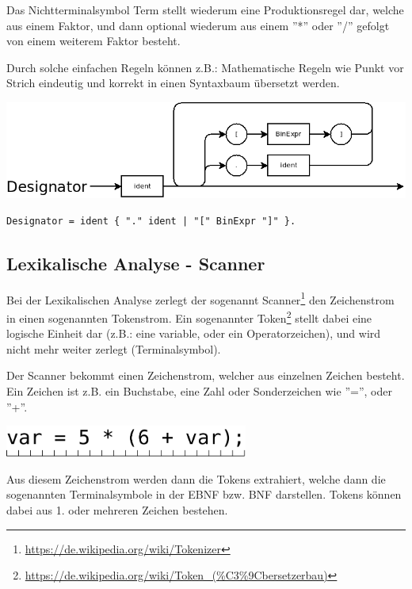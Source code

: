 Das Nichtterminalsymbol Term stellt wiederum eine Produktionsregel dar, welche aus einem Faktor, und dann optional wiederum aus einem ''*'' oder ''/'' gefolgt von einem weiterem Faktor besteht.

Durch solche einfachen Regeln können z.B.: Mathematische Regeln wie Punkt vor Strich eindeutig und korrekt in einen Syntaxbaum übersetzt werden.

\includegraphics[scale=0.5]{./media/images/compiler/ebnf_designator.png}
\begin{lstlisting}[language=EBNF]
Designator = ident { "." ident | "[" BinExpr "]" }.
\end{lstlisting}



\newpage

\subsection{Lexikalische Analyse - Scanner}

Bei der Lexikalischen Analyse zerlegt der sogenannt Scanner\footnote{\url{https://de.wikipedia.org/wiki/Tokenizer}} den Zeichenstrom in einen sogenannten Tokenstrom. Ein sogenannter Token\footnote{\url{https://de.wikipedia.org/wiki/Token_(\%C3\%9Cbersetzerbau)}} stellt dabei eine logische Einheit dar (z.B.: eine variable, oder ein Operatorzeichen), und wird nicht mehr weiter zerlegt (Terminalsymbol).


Der Scanner bekommt einen Zeichenstrom, welcher aus einzelnen Zeichen besteht. Ein Zeichen ist z.B. ein Buchstabe, eine Zahl oder Sonderzeichen wie ''='', oder ''+''.

\includegraphics[width=0.6\textwidth]{./media/images/compiler/input_characterstream.png}


Aus diesem Zeichenstrom werden dann die Tokens extrahiert, welche dann die sogenannten Terminalsymbole in der EBNF bzw. BNF darstellen. Tokens k\"onnen dabei aus 1. oder mehreren Zeichen bestehen.

